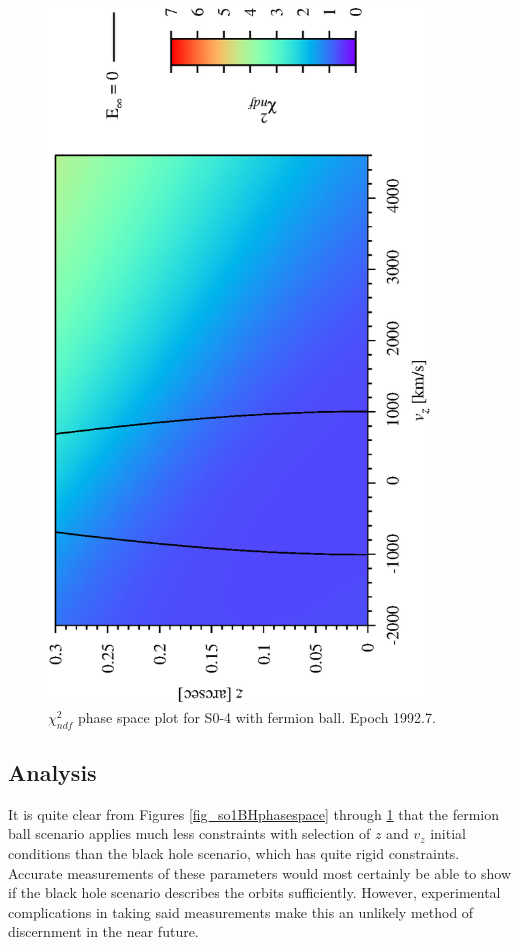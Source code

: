 \begin{figure}[!pt]
	\begin{center}
	\includegraphics[angle=-90,width=0.9\textwidth]{eps/so4-FB-run9.eps}
	\caption{$\chi^2_{ndf}$ phase space plot for S0-4 with fermion ball. Epoch 1992.7.}
	\label{fig_so4FBphasespace}
	\end{center}
\end{figure}
\clearpage

\subsection{Analysis}
It is quite clear from Figures \ref{fig_so1BHphasespace} through \ref{fig_so4FBphasespace} that the fermion ball scenario applies 
much less constraints with selection of $z$ and $v_z$ initial conditions than the black hole scenario, which has quite rigid constraints.
Accurate
measurements of these parameters would most certainly be able to show if the black hole scenario describes the orbits sufficiently.
However, experimental complications in taking said measurements make this an unlikely method of discernment in the near future.

